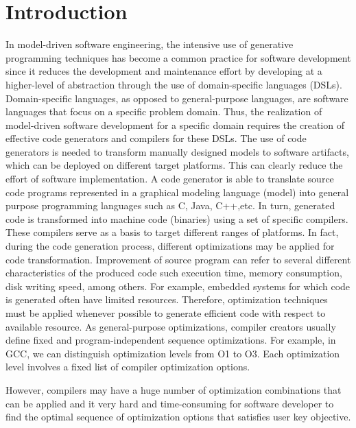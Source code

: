 \section{Introduction}
In model-driven software engineering, the intensive use of generative programming techniques has become a common practice for software development since it reduces the development and maintenance effort by developing at a higher-level of abstraction through the use of domain-specific languages (DSLs). 
Domain-specific languages, as opposed to general-purpose languages, are software languages that focus on a specific problem domain. Thus, the realization of model-driven software development for a specific domain requires the creation of effective code generators and compilers for these DSLs.
The use of code generators is needed to transform manually designed models to software artifacts, which can be deployed on different target platforms. This can clearly reduce the effort of software implementation. A code generator is able to translate source code programs represented in a graphical modeling language (model) into general purpose programming languages such as C, Java, C++,etc. In turn, generated code is transformed into machine code (binaries) using a set of specific compilers.
These compilers serve as a basis to target different ranges of platforms. 
In fact, during the code generation process, different optimizations may be applied for code transformation. Improvement of source program can refer to several different characteristics of the produced code such execution time, memory consumption, disk writing speed, among others.
For example, embedded systems for which code is generated often have limited resources. Therefore, optimization techniques must be applied whenever possible to generate efficient code with respect to available resource. 
As general-purpose optimizations, compiler creators usually
define fixed and program-independent sequence optimizations.
For example, in GCC, we can distinguish optimization levels
from O1 to O3. Each optimization level involves a fixed list of compiler optimization options. 

However, compilers may have a huge number of optimization
combinations that can be applied and it very hard and time-consuming for software developer to find the
optimal sequence of optimization options that satisfies user
key objective. 

